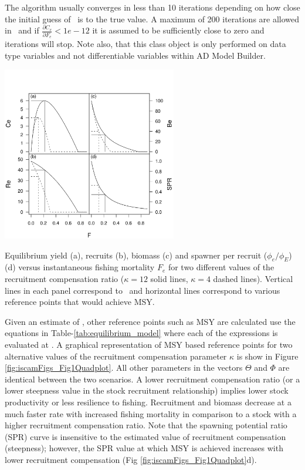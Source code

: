 The algorithm usually converges in less than 10 iterations depending on how close the initial guess of \fmsy\ is to the true value.  A maximum of 200 iterations are allowed in \iscam\ and if $\frac{\partial C_e}{\partial F_e}<1e-12$ it is assumed to be sufficiently close to zero and iterations will stop.  Note also, that this class object is only performed on data type variables and not differentiable variables within AD Model Builder.
 

\begin{figurehere}
    \centering
        \includegraphics[height=3in]{iscamFigs/Fig1Quadplot.pdf}
    \caption{Equilibrium yield (a), recruits (b), biomass (c) and
       spawner per recruit ($\phi_e/\phi_E$) (d) versus instantaneous
       fishing mortality $F_e$ for two different values of the recruitment
       compensation ratio ($\kappa=12$ solid lines, $\kappa=4$ dashed
       lines). Vertical lines in each panel correspond to \fmsy\ and
       horizontal lines correspond to various reference points that would
       achieve MSY.}
    \label{fig:iscamFigs_Fig1Quadplot}
\end{figurehere}

Given an estimate of \fmsy, other reference points such as MSY are calculated use the equations in Table-\ref{tab:equilibrium_model} where each of the expressions is evaluated at \fmsy.  A graphical representation of MSY based reference points for two alternative values of the recruitment compensation parameter $\kappa$ is show in Figure \ref{fig:iscamFigs_Fig1Quadplot}. All other parameters in the vectors $\Theta$ and $\Phi$ are identical between the two scenarios.  A lower recruitment compensation ratio (or a lower steepness value in the stock recruitment relationship) implies lower stock productivity or less resilience to fishing. Recruitment and biomass decrease at a much faster rate with increased fishing mortality in comparison to a stock with a higher recruitment compensation ratio. Note that the spawning potential ratio (SPR) curve is insensitive to the estimated value of recruitment compensation (steepness);  however, the SPR value at which MSY is achieved increases with lower recruitment compensation (Fig \ref{fig:iscamFigs_Fig1Quadplot}d).



